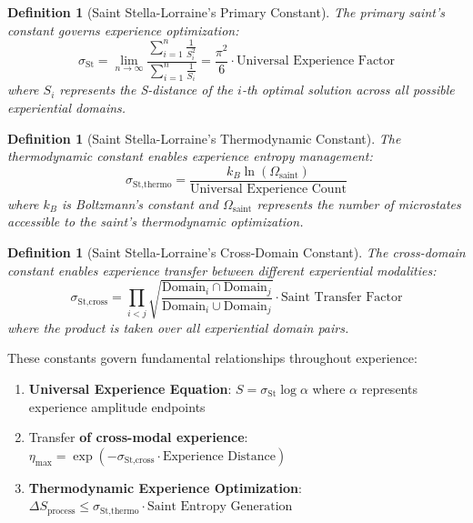 \documentclass{article}
\newtheorem{definition}[theorem]{Definition}
\begin{document}
\begin{definition}[Saint Stella-Lorraine's Primary Constant]
The primary saint's constant governs experience optimization:
\begin{equation}
\sigma_{\text{St}} = \lim_{n \to \infty} \frac{\sum_{i=1}^n \frac{1}{S_i^2}}{\sum_{i=1}^n \frac{1}{S_i}} = \frac{\pi^2}{6} \cdot \text{Universal Experience Factor}
\end{equation}
where $S_i$ represents the S-distance of the $i$-th optimal solution across all possible experiential domains.
\end{definition}

\begin{definition}[Saint Stella-Lorraine's Thermodynamic Constant]
The thermodynamic constant enables experience entropy management:
\begin{equation}
\sigma_{\text{St,thermo}} = \frac{k_B \ln(\Omega_{\text{saint}})}{\text{Universal Experience Count}}
\end{equation}
where $k_B$ is Boltzmann's constant and $\Omega_{\text{saint}}$ represents the number of microstates accessible to the saint's thermodynamic optimization.
\end{definition}

\begin{definition}[Saint Stella-Lorraine's Cross-Domain Constant]
The cross-domain constant enables experience transfer between different experiential modalities:
\begin{equation}
\sigma_{\text{St,cross}} = \prod_{i<j} \sqrt{\frac{\text{Domain}_i \cap \text{Domain}_j}{\text{Domain}_i \cup \text{Domain}_j}} \cdot \text{Saint Transfer Factor}
\end{equation}
where the product is taken over all experiential domain pairs.
\end{definition}

These constants govern fundamental relationships throughout experience:

\begin{enumerate}
\item \textbf{Universal Experience Equation}: $S = \sigma_{\text{St}} \log \alpha$ where $\alpha$ represents experience amplitude endpoints
\item Transfer \textbf{of cross-modal experience}: $\eta_{\text{max}} = \exp(-\sigma_{\text{St,cross}} \cdot \text{Experience Distance})$
\item \textbf{Thermodynamic Experience Optimization}: $\Delta S_{\text{process}} \leq \sigma_{\text{St,thermo}} \cdot \text{Saint Entropy Generation}$
\end{enumerate}
\end{document}
